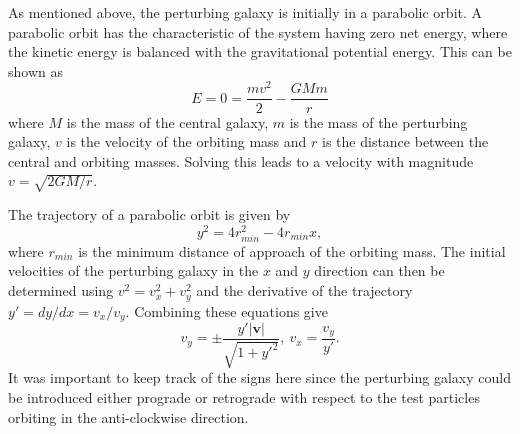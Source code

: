 \documentclass[twoside,twocolumn]{article}
\begin{document}
        As mentioned above, the perturbing galaxy is initially in a parabolic orbit. A parabolic orbit has the characteristic of the system having zero net energy, where the kinetic energy is balanced with the gravitational potential energy. This can be shown as
        \begin{equation}
            E = 0 = \frac{mv^2}{2} - \frac{GMm}{r}
        \end{equation}
        where $M$ is the mass of the central galaxy, $m$ is the mass of the perturbing galaxy, $v$ is the velocity of the orbiting mass and $r$ is the distance between the central and orbiting masses. Solving this leads to a velocity with magnitude $v = \sqrt{2GM/r}$. 
        
        The trajectory of a parabolic orbit is given by \cite{lecture}
        \begin{equation}
            y^2 = 4r_{min}^2 - 4r_{min}x,
        \end{equation}
        where $r_{min}$ is the minimum distance of approach of the orbiting mass. The initial velocities of the perturbing galaxy in the $x$ and $y$ direction can then be determined using $v^2 = v_x^2 + v_y^2$ and the derivative of the trajectory $y' = dy/dx = v_x/v_y$. Combining these equations give
        \begin{equation}
            v_y = \pm \frac{y'\lvert\bm{v}\lvert}{\sqrt{1 + y'^2}}, \ v_x = \frac{v_y}{y'}.
        \end{equation}
        It was important to keep track of the signs here since the perturbing galaxy could be introduced either prograde or retrograde with respect to the test particles orbiting in the anti-clockwise direction.
    
\end{document}
